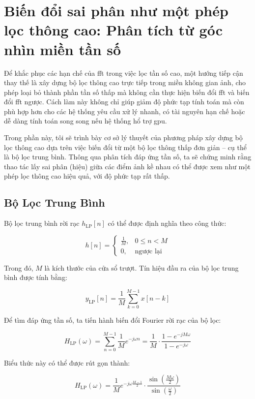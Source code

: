 \section{Biến đổi sai phân như một phép lọc thông cao: Phân tích từ góc nhìn miền tần số}

Để khắc phục các hạn chế của \gls{fft} trong việc lọc tần số cao, một hướng tiếp cận thay thế là xây dựng bộ lọc thông cao trực tiếp trong miền không gian ảnh, cho phép loại bỏ thành phần tần số thấp mà không cần thực hiện biến đổi \gls{fft} và biến đổi \gls{fft} ngược.
%
Cách làm này không chỉ giúp giảm độ phức tạp tính toán mà còn phù hợp hơn cho các hệ thống yêu cầu xử lý nhanh, có tài nguyên hạn chế hoặc dễ dàng tính toán song song nếu hệ thống hổ trợ \gls{gpu}.

Trong phần này, tôi sẽ trình bày cơ sở lý thuyết của phương pháp xây dựng bộ lọc thông cao dựa trên việc biến đổi từ một bộ lọc thông thấp đơn giản – cụ thể là bộ lọc trung bình. 
%
Thông qua phân tích đáp ứng tần số, ta sẽ chứng minh rằng thao tác lấy sai phân (hiệu) giữa các điểm ảnh kề nhau có thể được xem như một phép lọc thông cao hiệu quả, với độ phức tạp rất thấp.

\subsection{Bộ Lọc Trung Bình}

Bộ lọc trung bình rời rạc \( h_{\mathrm{LP}}[n] \) có thể được định nghĩa theo công thức:

\[
h[n] =
\begin{cases}
	\frac{1}{M}, & 0 \leq n < M \\
	0, & \text{ngược lại}
\end{cases}
\]

Trong đó, \( M \) là kích thước của cửa sổ trượt. Tín hiệu đầu ra của bộ lọc trung bình được tính bằng:

\[
y_{\mathrm{LP}}[n] = \frac{1}{M} \sum_{k=0}^{M-1} x[n-k]
\]

Để tìm đáp ứng tần số, ta tiến hành biến đổi Fourier rời rạc của bộ lọc:

\[
H_{\mathrm{LP}}(\omega) = \sum_{n=0}^{M-1} \frac{1}{M} e^{-j \omega n} = \frac{1}{M} \cdot \frac{1 - e^{-j M \omega}}{1 - e^{-j \omega}}
\]

Biểu thức này có thể được rút gọn thành:

\[
H_{\mathrm{LP}}(\omega) = \frac{1}{M} e^{-j \omega \frac{M-1}{2}} \cdot \frac{\sin\left(\frac{M \omega}{2}\right)}{\sin\left(\frac{\omega}{2}\right)}
\]

